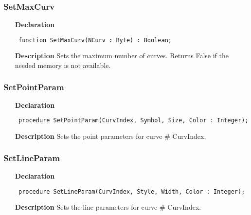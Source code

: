 \documentclass[12pt,a4paper,oneside]{report}
\newcommand{\declarationitem}[1]{\textbf{#1}}
\newcommand{\descriptiontitle}[1]{\textbf{#1}}
\newcommand{\code}[1]{\texttt{#1}}
\begin{document}
\subsubsection{SetMaxCurv}
\label{uplot-SetMaxCurv}
\begin{itemize}\item[\declarationitem{Declaration}\hfill]
	\begin{flushleft}
		\code{
			function SetMaxCurv(NCurv : Byte) : Boolean;}
		
	\end{flushleft}
	
	\par
	\item[\descriptiontitle{Description}]
	Sets the maximum number of curves. Returns False if the needed memory is not available.
	
\end{itemize}
\subsubsection{SetPointParam}
\label{uplot-SetPointParam}
\begin{itemize}\item[\declarationitem{Declaration}\hfill]
	\begin{flushleft}
		\code{
			procedure SetPointParam(CurvIndex, Symbol, Size, Color : Integer);}
		
	\end{flushleft}
	
	\par
	\item[\descriptiontitle{Description}]
	Sets the point parameters for curve {\#} CurvIndex.
	
\end{itemize}
\subsubsection{SetLineParam}
\label{uplot-SetLineParam}
\begin{itemize}\item[\declarationitem{Declaration}\hfill]
	\begin{flushleft}
		\code{
			procedure SetLineParam(CurvIndex, Style, Width, Color : Integer);}
		
	\end{flushleft}
	
	\par
	\item[\descriptiontitle{Description}]
	Sets the line parameters for curve {\#} CurvIndex.
	
\end{itemize}
\end{document}
